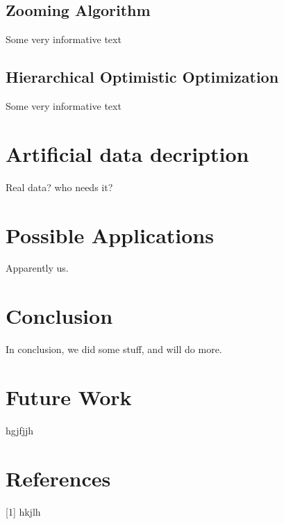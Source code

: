 \documentclass{article}
\begin{document}
\subsection{Zooming Algorithm}
Some very informative text

\subsection{Hierarchical Optimistic Optimization}
Some very informative text

\section{Artificial data decription}
Real data? who needs it?
\\
\section{Possible Applications}
Apparently us.
\\
\section{Conclusion}
In conclusion, we did some stuff, and will do more.
\\
\section{Future Work}
hgjfjjh

\section*{References}


[1] hkjlh
\end{document}
